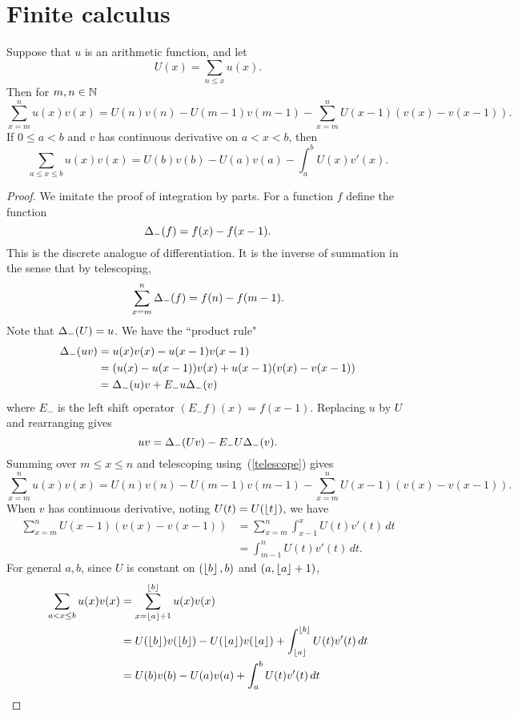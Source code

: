 \section{Finite calculus}
\begin{thm}
Suppose that $u$ is an arithmetic function, and let
\[
U(x)=\sum_{n\le x} u(x).
\]
Then for $m,n\in \mathbb{N}$ %
\[
\sum_{x=m}^n u(x)v(x)=U(n)v(n)-U(m-1)v(m-1) -\sum_{x=m}^n
U(x-1)(v(x)-v(x-1)).
\]
If $0\le a<b$ and $v$ has continuous derivative on $a<x<b$, then
\[
\sum_{a\le x\le b} u(x)v(x)=U(b)v(b)-U(a)v(a) -\int_{a}^b U(x)v'(x).
\]
\end{thm}
\begin{proof}
We imitate the proof of integration by parts. For a function $f$ define the function
\[
\Delta_-(f)=f(x)-f(x-1).
\]
This is the discrete analogue of differentiation. It is the inverse of summation in the sense that by telescoping,
\begin{equation}\label{telescope}
\sum_{x=m}^n\Delta_-(f)=f(n)-f(m-1).
\end{equation}
Note that $\Delta_-(U)=u$. 
We have the ``product rule"
\begin{align*}
\Delta_-(uv)&=u(x)v(x)-u(x-1)v(x-1)\\
&=(u(x)-u(x-1))v(x)+u(x-1)(v(x)-v(x-1))\\
&=\Delta_-(u)v+E_-u\Delta_-(v)
\end{align*}
where $E_-$ is the left shift operator $(E_-f)(x)=f(x-1)$. 
Replacing $u$ by $U$ and rearranging gives
\[
uv=\Delta_-(Uv)-E_-U\Delta_-(v).
\]
Summing over $m\le x\le n$ and telescoping using~(\ref{telescope}) gives
\[
\sum_{x=m}^n u(x)v(x)=U(n)v(n)-U(m-1)v(m-1) -\sum_{x=m}^n
U(x-1)(v(x)-v(x-1)).
\]
When $v$ has continuous derivative, noting $U(t)=U(\left\lfloor {t}\right\rfloor)$, we have
\begin{align*}
\sum_{x=m}^n
U(x-1)(v(x)-v(x-1))
&=\sum_{x=m}^n \int_{x-1}^{x}U(t)v'(t)\,dt\\
&=\int_{m-1}^n U(t)v'(t)\,dt.
\end{align*}
For general $a,b$, since $U$ is constant on $(\left\lfloor {b}\right\rfloor,b)$ and $(a,\left\lfloor {a}\right\rfloor+1)$,
\begin{align*}
\sum_{a<x\le b} u(x)v(x)
&=\sum_{x=\left\lfloor {a}\right\rfloor+1}^{\left\lfloor {b}\right\rfloor} u(x)v(x)\\
&=U(\left\lfloor {b}\right\rfloor)v(\left\lfloor {b}\right\rfloor) - U(\left\lfloor {a}\right\rfloor) v(\left\lfloor {a}\right\rfloor) +\int_{\left\lfloor {a}\right\rfloor}^{\left\lfloor {b}\right\rfloor} U(t)v'(t)\,dt\\
&=U(b)v(b) - U(a) v(a) +\int_{a}^{b} U(t)v'(t)\,dt\qedhere
\end{align*}
\end{proof}
